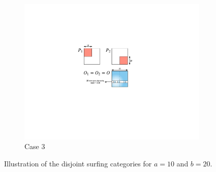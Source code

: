 \documentclass[conference]{IEEEtran}
\begin{document}
\begin{figure}
		\begin{subfigure}[b]{0.15\textwidth}
			\includegraphics[width=\textwidth]{./img/case3-2}
			\caption{Case 3}
			\label{fig:case3}
		\end{subfigure}
		\caption{Illustration of the disjoint surfing categories for $a = 10$ and $b = 20$.}\label{fig:dsurf}
	\end{figure}
	
\end{document}
